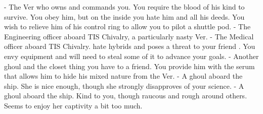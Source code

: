 \documentclass[char]{guildcamp4}
\begin{document}
\begin{itemz}[Notes]
	\item 
\end{itemz}

\begin{contacts}
	\contact{\cVone{}} - The Ver who owns and commands you. You require the blood of his kind to survive. You obey him, but on the inside you hate him and all his deeds. You wish to relieve him of his control ring to allow you to pilot a shuttle pod.
	\contact{\cVtwo{}} - The Engineering officer aboard TIS Chivalry, a particularly nasty Ver.
	\contact{\cVthree{}} - The Medical officer aboard TIS Chivalry. \cVthree{\They} hate hybrids and poses a threat to your friend \cRasputin{}. You envy \cVthree{\their} equipment and will need to steal some of it to advance your goals.
	\contact{\cRasputin{}} - Another ghoul and the closet thing you have to a friend. You provide him with the serum that allows him to hide his mixed nature from the Ver. 
	\contact{\cJoan{}} - A ghoul aboard the ship. She is nice enough, though she strongly disapproves of your science.  
	\contact{\cJulie{}} - A ghoul aboard the ship. Kind to you, though raucous and rough around others. Seems to enjoy her captivity a bit too much. 
\end{contacts}
\end{document}

